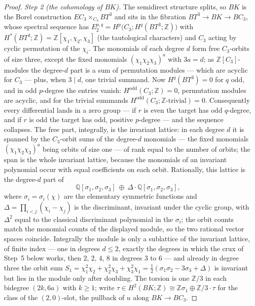 \documentclass[11pt,a4paper]{article}
\begin{document}
\begin{proof}
\emph{Step 2 (the cohomology of $BK$).} The semidirect structure splits, so
$BK$ is the Borel construction $EC_3\times_{C_3}BT^3$ and sits in the
fibration $BT^3\to BK\to BC_3$, whose spectral sequence has
$E_2^{p,q}=H^p\bigl(C_3;H^q(BT^3;\mathbb Z)\bigr)$ with
$H^*(BT^3;\mathbb Z)=\mathbb Z[\chi_1,\chi_2,\chi_3]$ (the tautological
characters) and $C_3$ acting by cyclic permutation of the $\chi_i$. The
monomials of each degree $d$ form free $C_3$-orbits of size three, except
the fixed monomials $(\chi_1\chi_2\chi_3)^a$ with $3a=d$; as
$\mathbb Z[C_3]$-modules the degree-$d$ part is a sum of permutation modules
--- which are acyclic for $C_3$ --- plus, when $3\mid d$, one trivial
summand. Now $H^q(BT^3)=0$ for $q$ odd, and in odd $p$-degree the entries
vanish: $H^{\mathrm{odd}}(C_3;\mathbb Z)=0$, permutation modules are
acyclic, and for the trivial summands $H^{\mathrm{odd}}(C_3;\mathbb Z
\text{-trivial})=0$. Consequently every differential lands in a zero group
--- if $r$ is even the target has odd $q$-degree, and if $r$ is odd the
target has odd, positive $p$-degree --- and the sequence collapses. The
free part, integrally, is the invariant lattice: in each degree $d$ it is
spanned by the $C_3$-orbit sums of the degree-$d$ monomials --- the fixed
monomials $(\chi_1\chi_2\chi_3)^a$ being orbits of size one --- of rank
equal to the number of orbits; the span is the whole invariant lattice,
because the monomials of an invariant polynomial occur with equal
coefficients on each orbit. Rationally, this lattice is the degree-$d$ part
of
\[
\mathbb Q[\sigma_1,\sigma_2,\sigma_3]\ \oplus\ \Delta\cdot
\mathbb Q[\sigma_1,\sigma_2,\sigma_3],
\]
where $\sigma_i=\sigma_i(\chi)$ are the elementary symmetric functions and
$\Delta=\prod_{i<j}(\chi_i-\chi_j)$ is the discriminant, invariant under the
cyclic group, with $\Delta^2$ equal to the classical discriminant polynomial
in the $\sigma_i$; the orbit counts match the monomial counts of the
displayed module, so the two rational vector spaces coincide. Integrally the
module is only a sublattice of the invariant lattice, of finite index ---
one in degrees $d\le2$, exactly the degrees in which the crux of Step~5
below works, then $2$, $2$, $4$, $8$ in degrees $3$ to $6$ --- and already in
degree three the orbit sum
$S_1=\chi_1^2\chi_2+\chi_2^2\chi_3+\chi_3^2\chi_1
=\tfrac12(\sigma_1\sigma_2-3\sigma_3+\Delta)$ is invariant but lies in the
module only after doubling. The
torsion is one $\mathbb Z/3$ in each bidegree $(2k,6a)$ with $k\ge1$; write
$\tau\in H^2(BK;\mathbb Z)\cong\mathbb Z\sigma_1\oplus\mathbb Z/3\cdot\tau$
for the class of the $(2,0)$-slot, the pullback of $u$ along
$BK\to BC_3$.


\end{proof}
\end{document}
